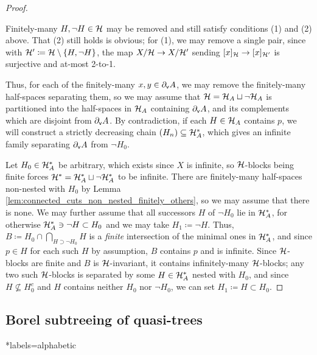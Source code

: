 \documentclass[reqno]{amsart}
\begin{document}
\begin{proof}
        \begin{center}
            \begin{minipage}{0.95\textwidth}
                \begin{observation*}
                    Finitely-many $H,\lnot H\in\mathcal{H}$ may be removed and still satisfy conditions (1) and (2) above. That (2) still holds is obvious; for (1), we may remove a single pair, since with $\mathcal{H}'\coloneqq\mathcal{H}\setminus\left\{H,\lnot H\right\}$, the map $X/\mathcal{H}\to X/\mathcal{H}'$ sending $[x]_{\mathcal{H}}\to[x]_{\mathcal{H}'}$ is surjective and at-most 2-to-1.
            \end{observation*}
            \end{minipage}
        \end{center}
        Thus, for each of the finitely-many $x,y\in\partial_\mathsf{v}A$, we may remove the finitely-many half-spaces separating them, so we may assume that $\mathcal{H}=\mathcal{H}_A\sqcup\lnot\mathcal{H}_A$ is partitioned into the half-spaces in $\mathcal{H}_A$ containing $\partial_\mathsf{v}A$, and its complements which are disjoint from $\partial_\mathsf{v}A$. By contradiction, if each $H\in\mathcal{H}_A$ contains $p$, we will construct a strictly decreasing chain $(H_n)\subseteq\mathcal{H}_A^\ast$, which gives an infinite family separating $\partial_\mathsf{v}A$ from $\lnot H_0$.

        Let $H_0\in\mathcal{H}_A^\ast$ be arbitrary, which exists since $X$ is infinite, so $\mathcal{H}$-blocks being finite forces $\mathcal{H}^\ast=\mathcal{H}_A^\ast\sqcup\lnot\mathcal{H}_A^\ast$ to be infinite. There are finitely-many half-spaces non-nested with $H_0$ by Lemma \ref{lem:connected_cuts_non_nested_finitely_others}, so we may assume that there is none. We may further assume that all successors $H$ of $\lnot H_0$ lie in $\mathcal{H}_A^\ast$, for otherwise $\mathcal{H}_A^\ast\ni\lnot H\subset H_0$ and we may take $H_1\coloneqq\lnot H$. Thus, $B\coloneqq H_0\cap\bigcap_{H\supset\lnot H_0}H$ is a \textit{finite} intersection of the minimal ones in $\mathcal{H}_A^\ast$, and since $p\in H$ for each such $H$ by assumption, $B$ contains $p$ and is infinite. Since $\mathcal{H}$-blocks are finite and $B$ is $\mathcal{H}$-invariant, it contains infinitely-many $\mathcal{H}$-blocks; any two such $\mathcal{H}$-blocks is separated by some $H\in\mathcal{H}_A^\ast$ nested with $H_0$, and since $H\not\subseteq H_0^c$ and $H$ contains neither $H_0$ nor $\lnot H_0$, we can set $H_1\coloneqq H\subset H_0$.
    \end{proof}

    \subsection{Borel subtreeing of quasi-trees}\label{sec:borel_subtreeing_of_quasi-trees}

    \TODO

    \begin{bibdiv}
        \begin{biblist}*{labels={alphabetic}}
        \end{biblist}
    \end{bibdiv}
\end{document}
